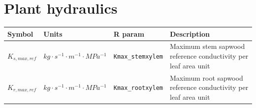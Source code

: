 \documentclass[]{book}
\begin{document}
\section{Plant hydraulics}\label{plant-hydraulics-2}

\begin{longtable}[]{@{}llll@{}}
\toprule
\begin{minipage}[b]{0.11\columnwidth}\raggedright\strut
Symbol\strut
\end{minipage} & \begin{minipage}[b]{0.10\columnwidth}\raggedright\strut
Units\strut
\end{minipage} & \begin{minipage}[b]{0.12\columnwidth}\raggedright\strut
R param\strut
\end{minipage} & \begin{minipage}[b]{0.45\columnwidth}\raggedright\strut
Description\strut
\end{minipage}\tabularnewline
\midrule
\endhead
\begin{minipage}[t]{0.11\columnwidth}\raggedright\strut
\(K_{s,max,ref}\)\strut
\end{minipage} & \begin{minipage}[t]{0.10\columnwidth}\raggedright\strut
\(kg \cdot s^{-1} \cdot m^{-1} \cdot MPa^{-1}\)\strut
\end{minipage} & \begin{minipage}[t]{0.12\columnwidth}\raggedright\strut
\texttt{Kmax\_stemxylem}\strut
\end{minipage} & \begin{minipage}[t]{0.45\columnwidth}\raggedright\strut
Maximum stem sapwood reference conductivity per leaf area unit\strut
\end{minipage}\tabularnewline
\begin{minipage}[t]{0.11\columnwidth}\raggedright\strut
\(K_{r,max,ref}\)\strut
\end{minipage} & \begin{minipage}[t]{0.10\columnwidth}\raggedright\strut
\(kg \cdot s^{-1} \cdot m^{-1} \cdot MPa^{-1}\)\strut
\end{minipage} & \begin{minipage}[t]{0.12\columnwidth}\raggedright\strut
\texttt{Kmax\_rootxylem}\strut
\end{minipage} & \begin{minipage}[t]{0.45\columnwidth}\raggedright\strut
Maximum root sapwood reference conductivity per leaf area unit\strut
\end{minipage}\tabularnewline

\end{longtable}
\end{document}
